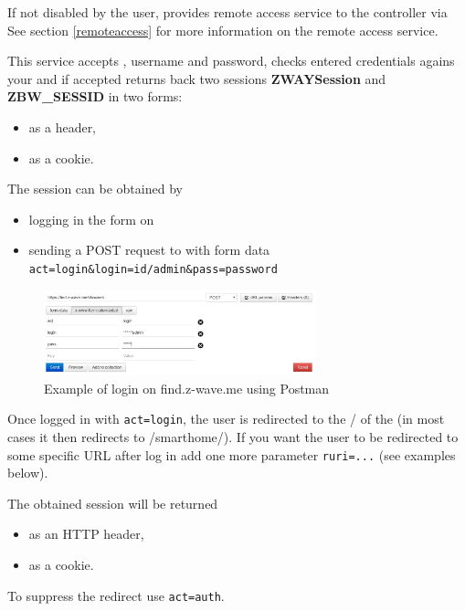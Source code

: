 If not disabled by the user, \zway provides remote access service to the controller via 
See section \ref{remoteaccess} for more information on the \zway remote access service.

This service accepts \zwaydeviceid, username and password, checks entered
credentials agains your \zway and if accepted returns back two sessions \textbf{ZWAYSession}
and \textbf{ZBW\_SESSID} in two forms:
\begin{itemize}
\item as a header,
\item as a cookie.
\end{itemize}

The session can be obtained by
\begin{itemize}
\item logging in the form on 
\item sending a POST request to  with form data \texttt{act=login\&login=id/admin\&pass=password}
\end{itemize}

\begin{figure}
\begin{center}
\includegraphics[width=0.7\textwidth]{pngs/cap13/find-login-postman.png}
\caption{Example of login on find.z-wave.me using Postman}
\label{authenticatioln_remote_find}
\end{center}
\end{figure}

Once logged in with \texttt{act=login}, the user is redirected to the / of the \zway (in most cases it then redirects to /smarthome/).
If you want the user to be redirected to some specific URL after log in add one more parameter \texttt{ruri=...} (see examples below).

The obtained session will be returned
\begin{itemize}
\item as an HTTP header,
\item as a cookie.
\end{itemize}

To suppress the redirect use \texttt{act=auth}.

